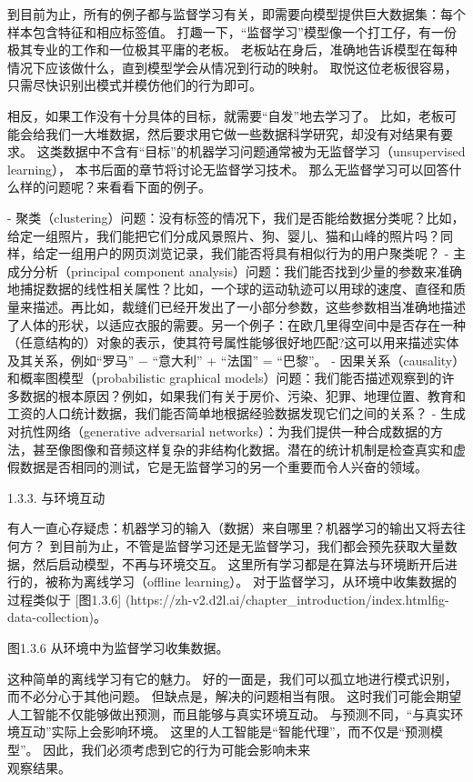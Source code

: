 到目前为止，所有的例子都与监督学习有关，即需要向模型提供巨大数据集：每个样本包含特征和相应标签值。 打趣一下，“监督学习”模型像一个打工仔，有一份极其专业的工作和一位极其平庸的老板。 老板站在身后，准确地告诉模型在每种情况下应该做什么，直到模型学会从情况到行动的映射。 取悦这位老板很容易，只需尽快识别出模式并模仿他们的行为即可。

相反，如果工作没有十分具体的目标，就需要“自发”地去学习了。 比如，老板可能会给我们一大堆数据，然后要求用它做一些数据科学研究，却没有对结果有要求。 这类数据中不含有“目标”的机器学习问题通常被为无监督学习（unsupervised learning）， 本书后面的章节将讨论无监督学习技术。 那么无监督学习可以回答什么样的问题呢？来看看下面的例子。

- 聚类（clustering）问题：没有标签的情况下，我们是否能给数据分类呢？比如，给定一组照片，我们能把它们分成风景照片、狗、婴儿、猫和山峰的照片吗？同样，给定一组用户的网页浏览记录，我们能否将具有相似行为的用户聚类呢？
- 主成分分析（principal component analysis）问题：我们能否找到少量的参数来准确地捕捉数据的线性相关属性？比如，一个球的运动轨迹可以用球的速度、直径和质量来描述。再比如，裁缝们已经开发出了一小部分参数，这些参数相当准确地描述了人体的形状，以适应衣服的需要。另一个例子：在欧几里得空间中是否存在一种（任意结构的）对象的表示，使其符号属性能够很好地匹配?这可以用来描述实体及其关系，例如“罗马” − “意大利” + “法国” = “巴黎”。
- 因果关系（causality）和概率图模型（probabilistic graphical models）问题：我们能否描述观察到的许多数据的根本原因？例如，如果我们有关于房价、污染、犯罪、地理位置、教育和工资的人口统计数据，我们能否简单地根据经验数据发现它们之间的关系？
- 生成对抗性网络（generative adversarial networks）：为我们提供一种合成数据的方法，甚至像图像和音频这样复杂的非结构化数据。潜在的统计机制是检查真实和虚假数据是否相同的测试，它是无监督学习的另一个重要而令人兴奋的领域。

 1.3.3. 与环境互动

有人一直心存疑虑：机器学习的输入（数据）来自哪里？机器学习的输出又将去往何方？ 到目前为止，不管是监督学习还是无监督学习，我们都会预先获取大量数据，然后启动模型，不再与环境交互。 这里所有学习都是在算法与环境断开后进行的，被称为离线学习（offline learning）。 对于监督学习，从环境中收集数据的过程类似于 [图1.3.6]
(https://zh-v2.d2l.ai/chapter\_introduction/index.htmlfig-data-collection)。


图1.3.6 从环境中为监督学习收集数据。

这种简单的离线学习有它的魅力。 好的一面是，我们可以孤立地进行模式识别，而不必分心于其他问题。 但缺点是，解决的问题相当有限。 这时我们可能会期望人工智能不仅能够做出预测，而且能够与真实环境互动。 与预测不同，“与真实环境互动”实际上会影响环境。 这里的人工智能是“智能代理”，而不仅是“预测模型”。 因此，我们必须考虑到它的行为可能会影响未来\\观察结果。

